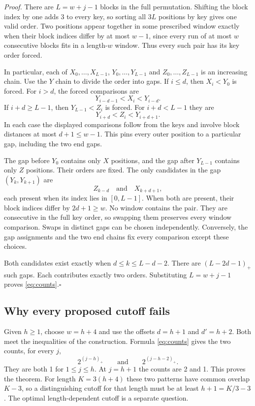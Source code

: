 \documentclass[11pt]{article}
\newcommand{\pos}[1]{(#1)_{+}}
\begin{document}
\textit{Proof.}
There are $L=w+j-1$ blocks in the full permutation. Shifting the block index by one adds 3 to every key, so sorting all $3L$ positions by key gives one valid order. Two positions appear together in some prescribed window exactly when their block indices differ by at most $w-1$, since every run of at most $w$ consecutive blocks fits in a length-$w$ window. Thus every such pair has its key order forced.

In particular, each of $X_0,\ldots,X_{L-1}$, $Y_0,\ldots,Y_{L-1}$ and $Z_0,\ldots,Z_{L-1}$ is an increasing chain. Use the $Y$ chain to divide the order into gaps. If $i\le d$, then $X_i<Y_0$ is forced. For $i>d$, the forced comparisons are
\[
       Y_{i-d-1}<X_i<Y_{i-d}.
\]
If $i+d\ge L-1$, then $Y_{L-1}<Z_i$ is forced. For $i+d<L-1$ they are
\[
       Y_{i+d}<Z_i<Y_{i+d+1}.
\]
In each case the displayed comparisons follow from the keys and involve block distances at most $d+1\le w-1$. This pins every outer position to a particular gap, including the two end gaps.

The gap before $Y_0$ contains only $X$ positions, and the gap after $Y_{L-1}$ contains only $Z$ positions. Their orders are fixed. The only candidates in the gap $(Y_k,Y_{k+1})$ are
\[
                Z_{k-d} \quad\text{and}\quad X_{k+d+1},
\]
each present when its index lies in $[0,L-1]$. When both are present, their block indices differ by $2d+1\ge w$. No window contains the pair. They are consecutive in the full key order, so swapping them preserves every window comparison. Swaps in distinct gaps can be chosen independently. Conversely, the gap assignments and the two end chains fix every comparison except these choices.

Both candidates exist exactly when $d\le k\le L-d-2$. There are $(L-2d-1)_+$ such gaps. Each contributes exactly two orders. Substituting $L=w+j-1$ proves \eqref{eq:counts}.\hfill$\square$

\subsection*{Why every proposed cutoff fails}
Given $h\ge1$, choose $w=h+4$ and use the offsets $d=h+1$ and $d'=h+2$. Both meet the inequalities of the construction. Formula \eqref{eq:counts} gives the two counts, for every $j$,
\[
      2^{\pos{j-h}} \qquad\text{and}\qquad 2^{\pos{j-h-2}}.
\]
They are both 1 for $1\le j\le h$. At $j=h+1$ the counts are 2 and 1. This proves the theorem. For length $K=3(h+4)$ these two patterns have common overlap $K-3$, so a distinguishing cutoff for that length must be at least $h+1=K/3-3$. The optimal length-dependent cutoff is a separate question.
\end{document}
